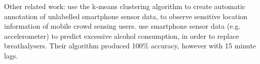 Other related work: 
\textcite{pius2018automatic} use the k-means clustering algorithm to create automatic annotation of unlabelled smartphone sensor data, to observe sensitive location information of mobile crowd sensing users. \textcite{alcoholCravingPrediction} use smartphone sensor data (e.g. accelerometer) to predict excessive alcohol consumption, in order to replace breathalysers. Their algorithm produced 100\% accuracy, however with 15 minute lags.